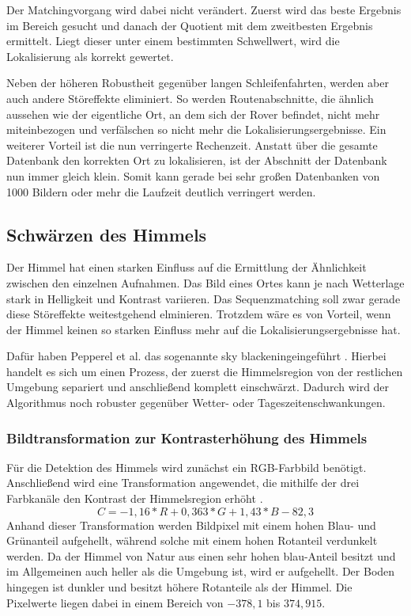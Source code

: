 \documentclass[12pt,a4paper,titlepage]{scrartcl}
\begin{document}
Der Matchingvorgang wird dabei nicht verändert. Zuerst wird das beste Ergebnis im Bereich gesucht und danach der Quotient mit dem zweitbesten Ergebnis ermittelt. Liegt dieser unter einem bestimmten Schwellwert, wird die Lokalisierung als korrekt gewertet. 

Neben der höheren Robustheit gegenüber langen Schleifenfahrten, werden aber auch andere Störeffekte eliminiert. So werden Routenabschnitte, die ähnlich aussehen wie der eigentliche Ort, an dem sich der Rover befindet, nicht mehr miteinbezogen und verfälschen so nicht mehr die Lokalisierungsergebnisse. Ein weiterer Vorteil ist die nun verringerte Rechenzeit. Anstatt über die gesamte Datenbank den korrekten Ort zu lokalisieren, ist der Abschnitt der Datenbank nun immer gleich klein. Somit kann gerade bei sehr großen Datenbanken von 1000 Bildern oder mehr die Laufzeit deutlich verringert werden.
\subsection{Schwärzen des Himmels}
Der Himmel hat einen starken Einfluss auf die Ermittlung der Ähnlichkeit zwischen den einzelnen Aufnahmen. Das Bild eines Ortes kann je nach Wetterlage stark in Helligkeit und Kontrast variieren. Das Sequenzmatching soll zwar gerade diese Störeffekte weitestgehend elminieren. Trotzdem wäre es von Vorteil, wenn der Himmel keinen so starken Einfluss mehr auf die Lokalisierungsergebnisse hat.

Dafür haben Pepperel et al. das sogenannte \glqq sky blackening\grqq\;eingeführt \cite{pepperell2013towards}. Hierbei handelt es sich um einen Prozess, der zuerst die Himmelsregion von der restlichen Umgebung separiert und anschließend komplett einschwärzt. Dadurch wird der Algorithmus noch robuster gegenüber Wetter- oder Tageszeitenschwankungen. 
\subsubsection{Bildtransformation zur Kontrasterhöhung des Himmels}
Für die Detektion des Himmels wird zunächst ein RGB-Farbbild benötigt. Anschließend wird eine Transformation angewendet, die mithilfe der drei Farbkanäle den Kontrast der Himmelsregion erhöht \cite{thurrowgood2009vision}.
\begin{equation}
C=-1{,}16*R+0{,}363*G+1{,}43*B-82,3
\end{equation}
Anhand dieser Transformation werden Bildpixel mit einem hohen Blau- und Grünanteil aufgehellt, während solche mit einem hohen Rotanteil verdunkelt werden. Da der Himmel von Natur aus einen sehr hohen blau-Anteil besitzt und im Allgemeinen auch heller als die Umgebung ist, wird er aufgehellt. Der Boden hingegen ist dunkler und besitzt höhere Rotanteile als der Himmel. Die Pixelwerte liegen dabei in einem Bereich von $-378{,}1$ bis $374{,}915$. 
\end{document}
